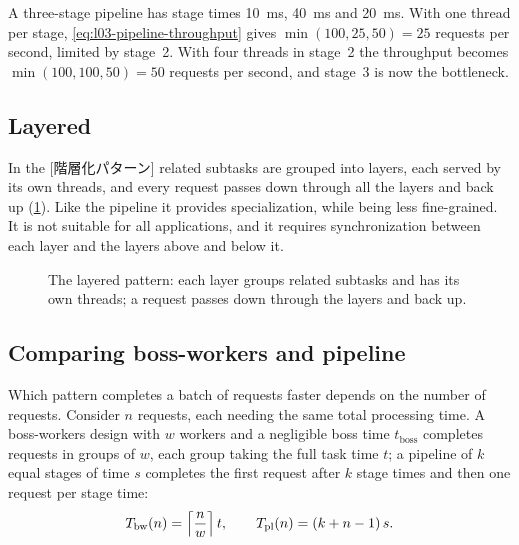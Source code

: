 \documentclass[../main.tex]{subfiles}
\begin{document}
\begin{example}
  A three-stage pipeline has stage times \SI{10}{\milli\second},
  \SI{40}{\milli\second} and \SI{20}{\milli\second}.  With one thread per
  stage, \cref{eq:l03-pipeline-throughput} gives
  $\min(100, 25, 50) = 25$ requests per second, limited by stage~2.  With
  four threads in stage~2 the throughput becomes $\min(100, 100, 50) = 50$
  requests per second, and stage~3 is now the bottleneck.
\end{example}

\subsection{Layered}

In the [階層化パターン] related subtasks are grouped
into layers, each served by its own threads, and every request passes down
through all the layers and back up (\cref{fig:l03-layered}).  Like the
pipeline it provides
specialization, while being less fine-grained.  It is not suitable for all
applications, and it requires synchronization between each layer and the
layers above and below it.

\begin{figure}[htbp]
  \centering
  
  \caption{The layered pattern: each layer groups related subtasks and has
    its own threads; a request passes down through the layers and back
    up.}
  \label{fig:l03-layered}
\end{figure}

\subsection{Comparing boss-workers and pipeline}

Which pattern completes a batch of requests faster depends on the number of
requests.  Consider $n$ requests, each needing the same total processing
time.  A boss-workers design with $w$ workers and a negligible boss time
$t_{\mathrm{boss}}$ completes requests in groups of $w$, each group taking
the full task time $t$; a pipeline of $k$ equal stages of time $s$ completes
the first request after $k$ stage times and then one request per stage time:
\begin{equation}
  T_{\mathrm{bw}}(n) = \Bigl\lceil \frac{n}{w} \Bigr\rceil\, t ,
  \qquad
  T_{\mathrm{pl}}(n) = (k + n - 1)\, s .
  \label{eq:l03-batch-time}
\end{equation}
\end{document}
